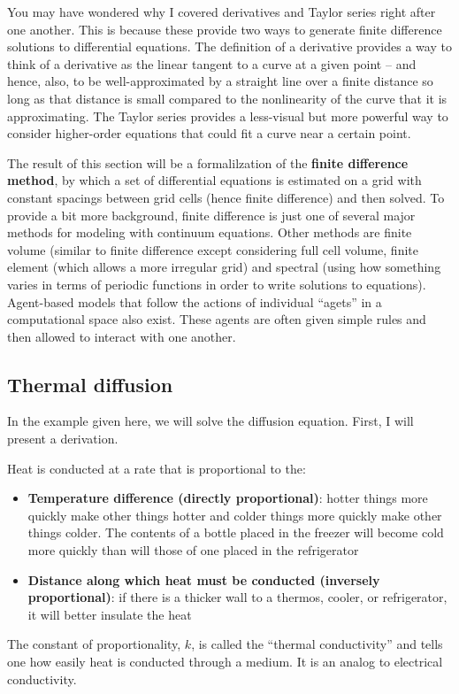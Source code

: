 \documentclass[a4paper,10pt]{scrartcl}
\begin{document}
You may have wondered why I covered derivatives and Taylor series right after one another. This is because these provide two ways to generate finite difference solutions to differential equations. The definition of a derivative provides a way to think of a derivative as the linear tangent to a curve at a given point -- and hence, also, to be well-approximated by a straight line over a finite distance so long as that distance is small compared to the nonlinearity of the curve that it is approximating. The Taylor series provides a less-visual but more powerful way to consider higher-order equations that could fit a curve near a certain point.

The result of this section will be a formalilzation of the \textbf{finite difference method}, by which a set of differential equations is estimated on a grid with constant spacings between grid cells (hence finite difference) and then solved. To provide a bit more background, finite difference is just one of several major methods for modeling with continuum equations. Other methods are finite volume (similar to finite difference except considering full cell volume, finite element (which allows a more irregular grid) and spectral (using how something varies in terms of periodic functions in order to write solutions to equations). Agent-based models that follow the actions of individual ``agets'' in a computational space also exist. These agents are often given simple rules and then allowed to interact with one another.

\subsection{Thermal diffusion}

In the example given here, we will solve the diffusion equation. First, I will present a derivation.

Heat is conducted at a rate that is proportional to the:
\begin{itemize}
 \item \textbf{Temperature difference (directly proportional)}: hotter things more quickly make other things hotter and colder things more quickly make other things colder. The contents of a bottle placed in the freezer will become cold more quickly than will those of one placed in the refrigerator
 \item \textbf{Distance along which heat must be conducted (inversely proportional)}: if there is a thicker wall to a thermos, cooler, or refrigerator, it will better insulate the heat
\end{itemize}
The constant of proportionality, $k$, is called the ``thermal conductivity'' and tells one how easily heat is conducted through a medium. It is an analog to electrical conductivity.
\end{document}
